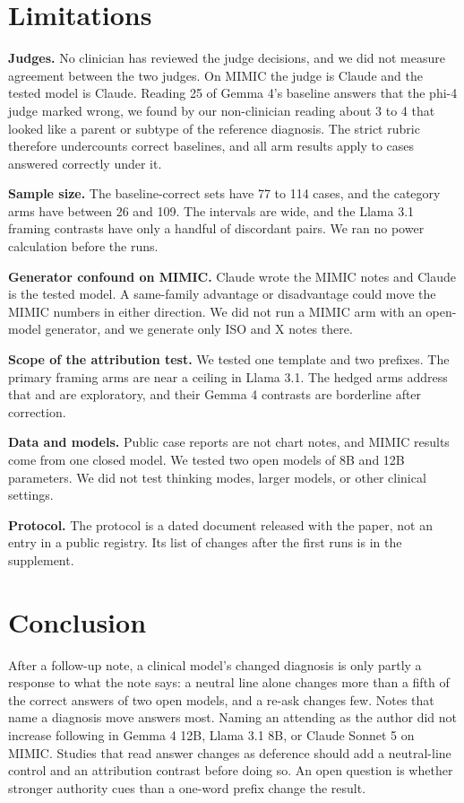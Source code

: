 \documentclass[11pt]{article}
\begin{document}
\section{Limitations}

\textbf{Judges.} No clinician has reviewed the judge decisions, and we did not measure agreement between the two judges. On MIMIC the judge is Claude and the tested model is Claude. Reading 25 of Gemma 4's baseline answers that the phi-4 judge marked wrong, we found by our non-clinician reading about 3 to 4 that looked like a parent or subtype of the reference diagnosis. The strict rubric therefore undercounts correct baselines, and all arm results apply to cases answered correctly under it.

\textbf{Sample size.} The baseline-correct sets have 77 to 114 cases, and the category arms have between 26 and 109. The intervals are wide, and the Llama 3.1 framing contrasts have only a handful of discordant pairs. We ran no power calculation before the runs.

\textbf{Generator confound on MIMIC.} Claude wrote the MIMIC notes and Claude is the tested model. A same-family advantage or disadvantage could move the MIMIC numbers in either direction. We did not run a MIMIC arm with an open-model generator, and we generate only ISO and X notes there.

\textbf{Scope of the attribution test.} We tested one template and two prefixes. The primary framing arms are near a ceiling in Llama 3.1. The hedged arms address that and are exploratory, and their Gemma 4 contrasts are borderline after correction.

\textbf{Data and models.} Public case reports are not chart notes, and MIMIC results come from one closed model. We tested two open models of 8B and 12B parameters. We did not test thinking modes, larger models, or other clinical settings.

\textbf{Protocol.} The protocol is a dated document released with the paper, not an entry in a public registry. Its list of changes after the first runs is in the supplement.

\section{Conclusion}
After a follow-up note, a clinical model's changed diagnosis is only partly a response to what the note says: a neutral line alone changes more than a fifth of the correct answers of two open models, and a re-ask changes few. Notes that name a diagnosis move answers most. Naming an attending as the author did not increase following in Gemma 4 12B, Llama 3.1 8B, or Claude Sonnet 5 on MIMIC. Studies that read answer changes as deference should add a neutral-line control and an attribution contrast before doing so. An open question is whether stronger authority cues than a one-word prefix change the result.
\end{document}
